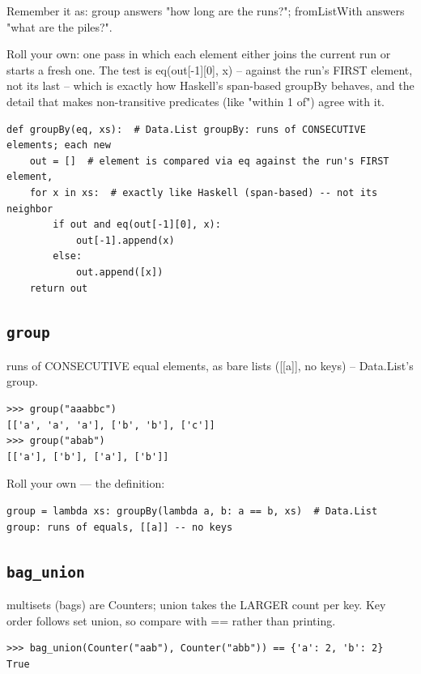\documentclass[10pt,letterpaper]{book}
\begin{document}
Remember it as: group answers "how long are the runs?"; fromListWith answers "what are the piles?".


Roll your own: one pass in which each element either joins the current run or starts a fresh one. The test is eq(out[-1][0], x) -- against the run's FIRST element, not its last -- which is exactly how Haskell's span-based groupBy behaves, and the detail that makes non-transitive predicates (like "within 1 of") agree with it.

\begin{lstlisting}[style=ex]
def groupBy(eq, xs):  # Data.List groupBy: runs of CONSECUTIVE elements; each new
    out = []  # element is compared via eq against the run's FIRST element,
    for x in xs:  # exactly like Haskell (span-based) -- not its neighbor
        if out and eq(out[-1][0], x):
            out[-1].append(x)
        else:
            out.append([x])
    return out
\end{lstlisting}

\subsection{\texttt{group}}\label{def:group}
runs of CONSECUTIVE equal elements, as bare lists ([[a]], no keys) -- Data.List's group.
\begin{lstlisting}[style=ex]
>>> group("aaabbc")
[['a', 'a', 'a'], ['b', 'b'], ['c']]
>>> group("abab")
[['a'], ['b'], ['a'], ['b']]
\end{lstlisting}

Roll your own --- the definition:

\begin{lstlisting}[style=ex]
group = lambda xs: groupBy(lambda a, b: a == b, xs)  # Data.List group: runs of equals, [[a]] -- no keys
\end{lstlisting}
\subsection{\texttt{bag\_union}}\label{def:bag-union}
multisets (bags) are Counters; union takes the LARGER count per key. Key order follows set union, so compare with == rather than printing.
\begin{lstlisting}[style=ex]
>>> bag_union(Counter("aab"), Counter("abb")) == {'a': 2, 'b': 2}
True
\end{lstlisting}
\end{document}
